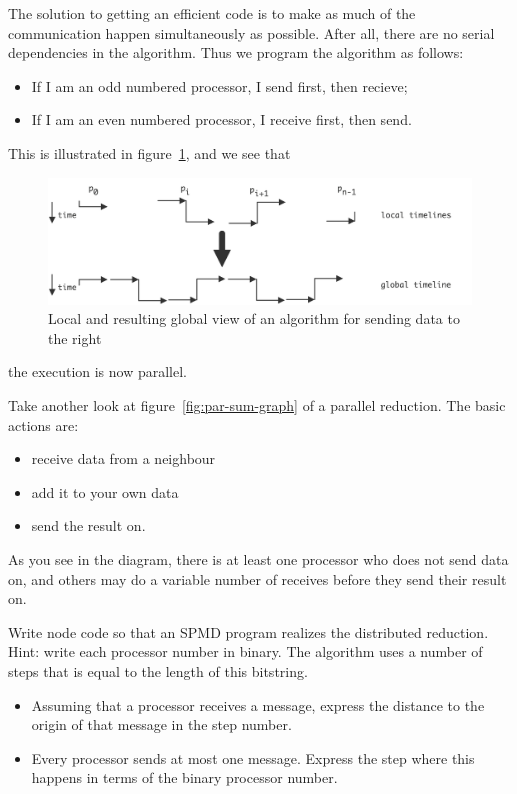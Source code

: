 The solution to getting an efficient code is to make as much of the
communication happen simultaneously as possible. After all, there are
no serial dependencies in the algorithm. Thus we program the algorithm
as follows:
\begin{itemize}
\item If I am an odd numbered processor, I send first, then recieve;
\item If I am an even numbered processor, I receive first, then send.
\end{itemize}
This is illustrated in figure~\ref{fig:wave_right_3}, and we see that
\begin{figure}
  \includegraphics[scale=.115]{graphics-public/wave_right_3}
  \caption{Local and resulting global view of an algorithm for sending
    data to the right}
  \label{fig:wave_right_3}
\end{figure}
the execution is now parallel.

\begin{exercise}
  Take another look at figure~\ref{fig:par-sum-graph} of a parallel
  reduction. The basic actions are:
  \begin{itemize}
  \item receive data from a neighbour
  \item add it to your own data
  \item send the result on.
  \end{itemize}
  As you see in the diagram, there is at least one processor who does
  not send data on, and others may do a variable number of receives
  before they send their result on.

  Write node code so that an \ac{SPMD} program realizes the
  distributed reduction. Hint: write each processor number in
  binary. The algorithm uses a number of steps that is equal to the
  length of this bitstring.
  \begin{itemize}
  \item Assuming that a processor receives a message, express the
    distance to the origin of that message in the step number.
  \item Every processor sends at most one message. Express the step 
    where this happens in terms of the binary processor number.
  \end{itemize}
\end{exercise}

